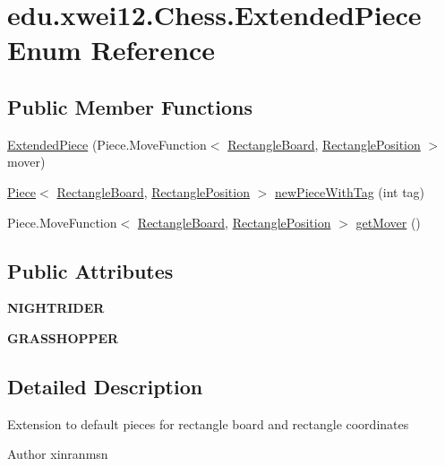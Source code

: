 \hypertarget{enumedu_1_1xwei12_1_1_chess_1_1_extended_piece}{}\section{edu.\+xwei12.\+Chess.\+Extended\+Piece Enum Reference}
\label{enumedu_1_1xwei12_1_1_chess_1_1_extended_piece}
\subsection*{Public Member Functions}
\begin{DoxyCompactItemize}
\item 
\hyperlink{enumedu_1_1xwei12_1_1_chess_1_1_extended_piece_a672bb0ed960bda0e3432c30ae152ffcb}{Extended\+Piece} (Piece.\+Move\+Function$<$ \hyperlink{classedu_1_1xwei12_1_1_chess_1_1_rectangle_board}{Rectangle\+Board}, \hyperlink{classedu_1_1xwei12_1_1_chess_1_1_rectangle_position}{Rectangle\+Position} $>$ mover)
\item 
\hyperlink{classedu_1_1xwei12_1_1_chess_1_1_piece}{Piece}$<$ \hyperlink{classedu_1_1xwei12_1_1_chess_1_1_rectangle_board}{Rectangle\+Board}, \hyperlink{classedu_1_1xwei12_1_1_chess_1_1_rectangle_position}{Rectangle\+Position} $>$ \hyperlink{enumedu_1_1xwei12_1_1_chess_1_1_extended_piece_a22b69049b0511cfc74668755ded75406}{new\+Piece\+With\+Tag} (int tag)
\item 
Piece.\+Move\+Function$<$ \hyperlink{classedu_1_1xwei12_1_1_chess_1_1_rectangle_board}{Rectangle\+Board}, \hyperlink{classedu_1_1xwei12_1_1_chess_1_1_rectangle_position}{Rectangle\+Position} $>$ \hyperlink{enumedu_1_1xwei12_1_1_chess_1_1_extended_piece_a828cae2cb668efc9973f24b075154192}{get\+Mover} ()
\end{DoxyCompactItemize}
\subsection*{Public Attributes}
\begin{DoxyCompactItemize}
\item 
{\bfseries N\+I\+G\+H\+T\+R\+I\+D\+ER}
\item 
{\bfseries G\+R\+A\+S\+S\+H\+O\+P\+P\+ER}
\end{DoxyCompactItemize}


\subsection{Detailed Description}
Extension to default pieces for rectangle board and rectangle coordinates \begin{DoxyAuthor}{Author}
xinranmsn 
\end{DoxyAuthor}


